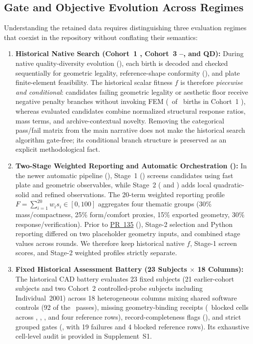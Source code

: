 \subsection{Gate and Objective Evolution Across Regimes}
\label{subsec:gate-evolution}
Understanding the retained data requires distinguishing three evaluation regimes that coexist in the repository without conflating their semantics:
\begin{enumerate}
  \item \textbf{Historical Native Search (Cohort~1 , Cohort~3 --, and  QD):} During native quality-diversity evolution (), each birth is decoded and checked sequentially for geometric legality, reference-shape conformity (), and plate finite-element feasibility. The historical scalar fitness $f$ is therefore \emph{piecewise and conditional}: candidates failing geometric legality or aesthetic floor receive negative penalty branches without invoking FEM (\FemNotEvaluated\ of \BirthCount\ births in Cohort~1 ), whereas evaluated candidates combine normalized structural response ratios, mass terms, and archive-contextual novelty. Removing the categorical pass/fail matrix from the main narrative does not make the historical search algorithm gate-free; its conditional branch structure is preserved as an explicit methodological fact.
  \item \textbf{Two-Stage Weighted Reporting and Automatic Orchestration ():} In the newer automatic pipeline (), Stage~1 () screens candidates using fast plate and geometric observables, while Stage~2 ( and ) adds local quadratic-solid and refined observations. The 20-term weighted reporting profile $F = \sum_{i=1}^{20} w_i s_i \in [0,100]$ aggregates four thematic groups (30\% mass/compactness, 25\% form/comfort proxies, 15\% exported geometry, 30\% response/verification). Prior to \href{https://github.com/neverhuman/jarambit/pull/135}{PR~135} (), Stage-2 selection and Python reporting differed on two placeholder geometry inputs, and  combined stage values across rounds. We therefore keep historical native $f$, Stage-1 screen scores, and Stage-2 weighted profiles strictly separate.
  \item \textbf{Fixed Historical Assessment Battery (23 Subjects $\times$ 18 Columns):} The historical CAD battery evaluates 23 fixed subjects (21 earlier-cohort subjects and two Cohort~2 controlled-probe subjects including Individual~2001) across 18 heterogeneous columns mixing shared software controls (92 of the \BatteryPass\ passes), missing geometry-binding receipts (\BatteryBlocked\ blocked cells across , , , and four reference rows), record-completeness flags (), and strict grouped gates (, with 19 failures and 4 blocked reference rows). Its exhaustive cell-level audit is provided in Supplement~S1.
\end{enumerate}

